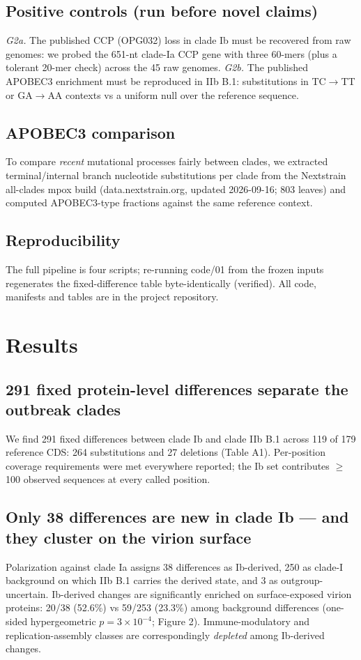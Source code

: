 \documentclass[11pt]{article}
\begin{document}
\subsection{Positive controls (run before novel claims)}
\emph{G2a.} The published CCP (OPG032) loss in clade Ib must be recovered from raw genomes: we
probed the 651-nt clade-Ia CCP gene with three 60-mers (plus a tolerant 20-mer check) across the 45
raw genomes. \emph{G2b.} The published APOBEC3 enrichment must be reproduced in IIb B.1:
substitutions in TC$\rightarrow$TT or GA$\rightarrow$AA contexts vs a uniform null over the
reference sequence.

\subsection{APOBEC3 comparison}
To compare \emph{recent} mutational processes fairly between clades, we extracted terminal/internal
branch nucleotide substitutions per clade from the Nextstrain all-clades mpox build
(data.nextstrain.org, updated 2026-09-16; 803 leaves) and computed APOBEC3-type fractions against
the same reference context.

\subsection{Reproducibility}
The full pipeline is four scripts; re-running code/01 from the frozen inputs regenerates the
fixed-difference table byte-identically (verified). All code, manifests and tables are in the
project repository.

\section{Results}
\subsection{291 fixed protein-level differences separate the outbreak clades}
We find 291 fixed differences between clade Ib and clade IIb B.1 across 119 of 179 reference CDS:
264 substitutions and 27 deletions (Table A1). Per-position coverage requirements were met
everywhere reported; the Ib set contributes $\geq$100 observed sequences at every called position.

\subsection{Only 38 differences are new in clade Ib --- and they cluster on the virion surface}
Polarization against clade Ia assigns 38 differences as Ib-derived, 250 as clade-I background on
which IIb B.1 carries the derived state, and 3 as outgroup-uncertain. Ib-derived changes are
significantly enriched on surface-exposed virion proteins: 20/38 (52.6\%) vs 59/253 (23.3\%) among
background differences (one-sided hypergeometric $p=3\times10^{-4}$; Figure 2). Immune-modulatory
and replication-assembly classes are correspondingly \emph{depleted} among Ib-derived changes.
\end{document}
